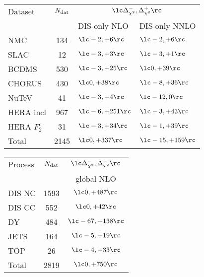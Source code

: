 \begin{center}
\renewcommand*{\arraystretch}{1.7}
\footnotesize
\begin{tabular}{|l|c|ll|}
  \toprule
  Dataset  &   $N_{\rm dat}$ & \multicolumn{2}{c|}{$\lc
     \Delta_{\chi^2}^-, \Delta_{\chi^2}^+\rc$}\\
    &   &    DIS-only NLO   &  DIS-only NNLO  \\
\toprule
NMC         & 134 &    $\lc    -2  , +6  \rc$   &  $\lc    -2  ,  +6  \rc$        \\ 
SLAC        & 12  & $\lc    -3  ,  +3  \rc$   &  $\lc    -3  ,   +1  \rc$       \\ 
BCDMS       & 530 &  $\lc    -3  ,    +25  \rc$  &   $\lc     0  ,  +39  \rc$       \\ 
CHORUS      & 430 &  $\lc     0  ,    +38  \rc$  &   $\lc    -8 ,    +36  \rc$        \\ 
NuTeV       & 41  & $\lc    -3  ,   +4  \rc$ &  $\lc   -12  ,     0  \rc$       \\ 
HERA incl   & 967 & $\lc    -6  ,   +251  \rc$  &   $\lc    -3  ,    +43  \rc$       \\ 
HERA $F_2^c$& 31  & $\lc    -3  ,    +34  \rc$  &  $\lc    -1 , +39  \rc$        \\ 
\midrule
Total       &2145 & $\lc     0  ,   +337  \rc$  &  $\lc   -15  ,   +159  \rc$        \\ 
\bottomrule
\end{tabular}
\qquad
\begin{tabular}{|l|c|c|}
\toprule
Process  &   $N_{\rm dat}$ & $\lc\Delta_{\chi^2}^-, \Delta_{\chi^2}^+\rc$\\
         &               & global NLO \\
\midrule
DIS NC & 1593 & $\lc   0, +487\rc$\\
DIS CC &  552 & $\lc   0,  +42\rc$\\
\midrule
DY     &  484 & $\lc -67, +138\rc$\\
JETS   &  164 & $\lc  -5,  +19\rc$\\
TOP    &   26 & $\lc  -4,  +33\rc$\\
\midrule
Total  & 2819 & $\lc   0, +750\rc$\\
\bottomrule
\end{tabular}
\end{center}
